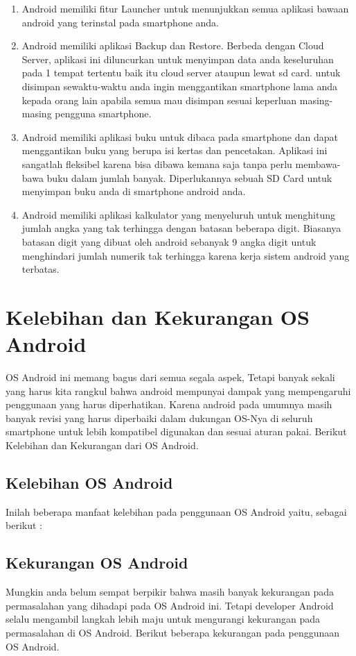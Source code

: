 \begin{enumerate}
		\item Android memiliki fitur Launcher untuk menunjukkan semua aplikasi bawaan android yang terinstal pada smartphone anda.
		\item Android memiliki aplikasi Backup dan Restore. Berbeda dengan Cloud Server, aplikasi ini diluncurkan untuk menyimpan data anda keseluruhan pada 1 tempat tertentu baik itu cloud server ataupun lewat sd card.
			untuk disimpan sewaktu-waktu anda ingin menggantikan smartphone lama anda kepada orang lain apabila semua mau disimpan sesuai keperluan masing-masing pengguna smartphone.
		\item Android memiliki aplikasi buku untuk dibaca pada smartphone dan dapat menggantikan buku yang berupa isi kertas dan pencetakan. Aplikasi ini sangatlah fleksibel karena bisa dibawa kemana saja tanpa perlu membawa-bawa
			buku dalam jumlah banyak. Diperlukannya sebuah SD Card untuk menyimpan buku anda di smartphone android anda.
		\item Android memiliki aplikasi kalkulator yang menyeluruh untuk menghitung jumlah angka yang tak terhingga dengan batasan beberapa digit. Biasanya batasan digit yang dibuat oleh android sebanyak 9 angka digit
			untuk menghindari jumlah numerik tak terhingga karena kerja sistem android yang terbatas.
\end{enumerate}
	\cite{anwar2014implementasi}
	\section{Kelebihan dan Kekurangan OS Android}
		OS Android ini memang bagus dari semua segala aspek, Tetapi banyak sekali yang harus kita rangkul bahwa android mempunyai dampak yang mempengaruhi penggunaan yang harus diperhatikan. Karena android pada umumnya masih banyak revisi
		yang harus diperbaiki dalam dukungan OS-Nya di seluruh smartphone untuk lebih kompatibel digunakan dan sesuai aturan pakai. Berikut Kelebihan dan Kekurangan dari OS Android.
	
	\subsection{Kelebihan OS Android}
		Inilah beberapa manfaat kelebihan pada penggunaan OS Android yaitu, sebagai berikut :
		\cite{hamka2013aplikasi}
		
	\subsection{Kekurangan OS Android}
		Mungkin anda belum sempat berpikir bahwa masih banyak kekurangan pada permasalahan yang dihadapi pada OS Android ini. Tetapi developer Android selalu mengambil langkah lebih maju untuk mengurangi
		kekurangan pada permasalahan di OS Android. Berikut beberapa kekurangan pada penggunaan OS Android.
		\cite{hamka2013aplikasi}
	
